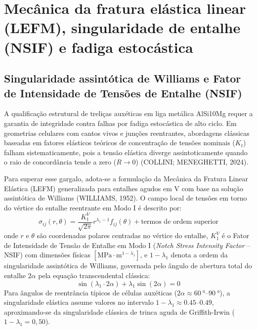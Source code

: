 \section{Mecânica da fratura elástica linear (LEFM), singularidade de entalhe (NSIF) e fadiga estocástica}
\label{sec:lefm-nsif-teoria}

\subsection{Singularidade assintótica de Williams e Fator de Intensidade de Tensões de Entalhe (NSIF)}
\label{subsec:nsif-teoria}

A qualificação estrutural de treliças auxéticas em liga metálica AlSi10Mg requer a garantia de integridade contra falhas por fadiga estocástica de alto ciclo. Em geometrias celulares com cantos vivos e junções reentrantes, abordagens clássicas baseadas em fatores elásticos teóricos de concentração de tensões nominais ($K_t$) falham sistematicamente, pois a tensão elástica diverge assintoticamente quando o raio de concordância tende a zero ($R \to 0$) (COLLINI; MENEGHETTI, 2024).

Para superar esse gargalo, adota-se a formulação da Mecânica da Fratura Linear Elástica (LEFM) generalizada para entalhes agudos em V com base na solução assintótica de Williams (WILLIAMS, 1952). O campo local de tensões em torno do vértice do entalhe reentrante em Modo I é descrito por:
\begin{equation}
  \sigma_{ij}(r, \theta) = \frac{K_1^V}{\sqrt{2\pi}} r^{\lambda_1 - 1} f_{ij}(\theta) + \text{termos de ordem superior}
  \label{eq:williams-teoria}
\end{equation}
onde $r$ e $\theta$ são coordenadas polares centradas no vértice do entalhe, $K_1^V$ é o Fator de Intensidade de Tensão de Entalhe em Modo I (\textit{Notch Stress Intensity Factor} -- NSIF) com dimensões físicas $[\text{MPa}\cdot\text{m}^{1-\lambda_1}]$, e $1-\lambda_1$ denota a ordem da singularidade assintótica de Williams, governada pelo ângulo de abertura total do entalhe $2\alpha$ pela equação transcendental clássica:
\begin{equation}
  \sin(\lambda_1 \cdot 2\alpha) + \lambda_1 \sin(2\alpha) = 0
  \label{eq:transcendental-williams}
\end{equation}
Para ângulos de reentrância típicos de células auxéticas ($2\alpha \approx \SIrange{60}{90}{\degree}$), a singularidade elástica assume valores no intervalo $1-\lambda_1 \approx \numrange{0.45}{0.49}$, aproximando-se da singularidade clássica de trinca aguda de Griffith-Irwin ($1-\lambda_1 = 0{,}50$).

